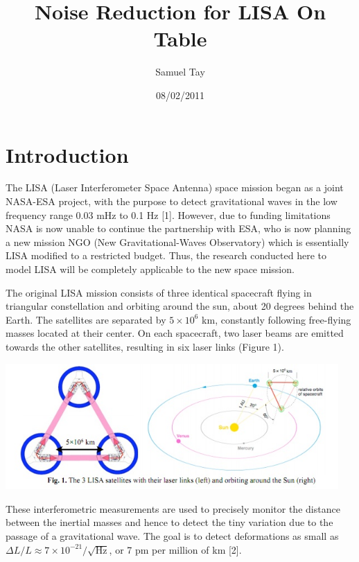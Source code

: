 \documentclass[11 pt]{article}
\title{Noise Reduction for LISA On Table}
\author{Samuel Tay}
\date{08/02/2011}
\begin{document}
\maketitle



\section{Introduction}

\indent\indent The LISA (Laser Interferometer Space Antenna) space mission began as a joint NASA-ESA project, with the purpose to detect gravitational waves in the low frequency range 0.03 mHz to 0.1 Hz [1]. However, due to funding limitations NASA is now unable to continue the partnership with ESA, who is now planning a new mission NGO (New Gravitational-Waves Observatory) which is essentially LISA modified to a restricted budget. Thus, the research conducted here to model LISA will be completely applicable to the new space mission.

The original LISA mission consists of three identical spacecraft flying in triangular constellation and orbiting around the sun, about 20 degrees behind the Earth. The satellites are separated by $5\times 10^6$ km, constantly following free-flying masses located at their center. On each spacecraft, two laser beams are emitted towards the other satellites, resulting in six laser links (Figure 1).  \\
\begin{center}\includegraphics[width=5in]{figure1.jpg}\\\end{center}
These interferometric measurements are used to precisely monitor the distance between the inertial masses and hence to detect the tiny variation due to the passage of a gravitational wave. The goal is to detect deformations as small as $\Delta L/L\approx 7\times 10^{-21} /\sqrt{\text{Hz}}$, or 7 pm per million of km [2].
\end{document}
